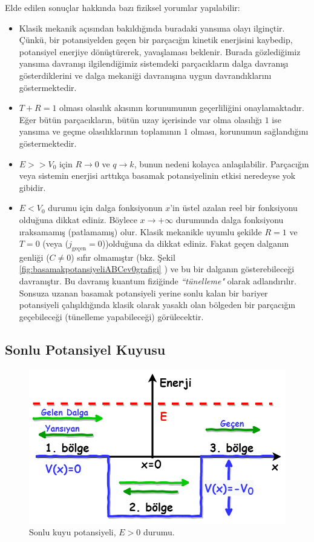 \documentclass[a4paper,12pt, twoside]{article}
\begin{document}
Elde edilen sonuçlar hakkında bazı fiziksel yorumlar yapılabilir:
\begin{itemize}
	\item Klasik mekanik açısından bakıldığında buradaki yansıma olayı ilginçtir. Çünkü, bir potansiyelden geçen bir parçacığın kinetik enerjisini kaybedip, potansiyel enerjiye dönüştürerek, yavaşlaması beklenir. Burada gözlediğimiz yansıma davranışı ilgilendiğimiz sistemdeki parçacıkların dalga davranışı gösterdiklerini ve dalga mekaniği davranışına uygun davrandıklarını göstermektedir.
	
	\item $T + R = 1$ olması olasılık akısının korunumunun geçerliliğini onaylamaktadır. Eğer bütün parçacıkların, bütün uzay içerisinde var olma olasılığı $1$ ise yansıma ve geçme olasılıklarının toplamının $1$ olması, korunumun sağlandığını göstermektedir.
	
	\item $E>>V_0$ için $R\rightarrow0$ ve $q\rightarrow k$, bunun nedeni kolayca anlaşılabilir. Parçacığın veya sistemin enerjisi arttıkça basamak potansiyelinin etkisi neredeyse yok gibidir.
	
	\item $E<V_0$ durumu için dalga fonksiyonun $x$'in üstel azalan reel bir fonksiyonu olduğuna dikkat ediniz. Böylece $x\rightarrow+\infty$ durumunda dalga fonksiyonu ıraksamamış (patlamamış) olur. Klasik mekanikle uyumlu şekilde $R=1$ ve $T=0$ (veya ($j_\text{geçen} = 0$))olduğuna da dikkat ediniz. Fakat geçen dalganın genliği ($C\neq0$) sıfır olmamıştır (bkz. Şekil \ref{fig:basamakpotansiyeliABCev0grafigi} ) ve bu bir dalganın gösterebileceği davranıştır. Bu davranış kuantum fiziğinde \emph{``tünelleme"} olarak adlandırılır. Sonsuza uzanan basamak potansiyeli yerine sonlu kalan bir bariyer potansiyeli çalışıldığında klasik olarak yasaklı olan bölgeden bir parçacığın geçebileceği (tünelleme yapabileceği) görülecektir. 
	
\end{itemize}

\subsection{Sonlu Potansiyel Kuyusu}

\begin{figure}[hbtp]
	\centering
	\includegraphics[width=0.62\linewidth]{figurler/SonluKuyu_Potansiyeli.png}
	\caption{Sonlu kuyu potansiyeli, $E>0$ durumu.}
	\label{fig:sonlukuyupotansiyeli}
\end{figure}
\end{document}
